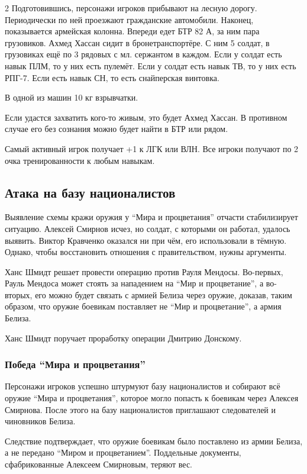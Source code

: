 \documentclass[twoside]{article}
\begin{document}
\begin{multicols}{2}
Подготовившись, персонажи игроков прибывают на лесную дорогу.
Периодически по ней проезжают гражданские автомобили. Наконец,
показывается армейская колонна. Впереди едет БТР 82 А, за ним пара
грузовиков. Ахмед Хассан сидит в бронетранспортёре. С ним 5 солдат, в
грузовиках ещё по 3 рядовых с мл. сержантом в каждом. Если у солдат есть
навык ПЛМ, то у них есть пулемёт. Если у солдат есть навык
ТВ, то у них есть РПГ-7. Если есть навык СН,
то есть снайперская винтовка.

В одной из машин 10 кг взрывчатки.

Если удастся захватить кого-то живым, это будет Ахмед Хассан. В
противном случае его без сознания можно будет найти в БТР или рядом.

Самый активный игрок получает +1 к ЛГК или ВЛН. Все игроки получают по 2 очка
тренированности к любым навыкам.

\subsection{Атака на базу националистов}\label{nationalist-base-attack}

Выявление схемы кражи оружия у \enquote{Мира и процветания} отчасти
стабилизирует ситуацию. Алексей Смирнов исчез, но солдат, с которыми он
работал, удалось выявить. Виктор Кравченко оказался ни при чём, его
использовали в тёмную. Однако, чтобы восстановить отношения с
правительством, нужны аргументы.

Ханс Шмидт решает провести операцию против Рауля Мендосы. Во-первых,
Рауль Мендоса может стоять за нападением на \enquote{Мир и процветание}, а
во-вторых, его можно будет связать с армией Белиза через оружие,
доказав, таким образом, что оружие боевикам поставляет не \enquote{Мир и
процветание}, а армия Белиза.

Ханс Шмидт поручает проработку операции Дмитрию Донскому.

\subsubsection{Победа \enquote{Мира и процветания}}\label{pap-victory}

Персонажи игроков успешно штурмуют базу националистов и собирают всё
оружие \enquote{Мира и процветания}, которое могло попасть к боевикам через
Алексея Смирнова. После этого на базу националистов приглашают
следователей и чиновников Белиза.

Следствие подтверждает, что оружие боевикам было поставлено из армии
Белиза, а не передано \enquote{Миром и процветанием}. Поддельные документы,
сфабрикованные Алексеем Смирновым, теряют вес.


\end{multicols}
\end{document}
